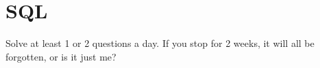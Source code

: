 \chapter{SQL}
\label{chap:SQL}

\begin{tcolorbox}[colback=aliceblue!10!white,colframe=red!70!black,title=\textbf{WARNING}]
Solve at least 1 or 2 questions a day. If you stop for 2 weeks, it will all be forgotten, or is it just me?
\end{tcolorbox}




